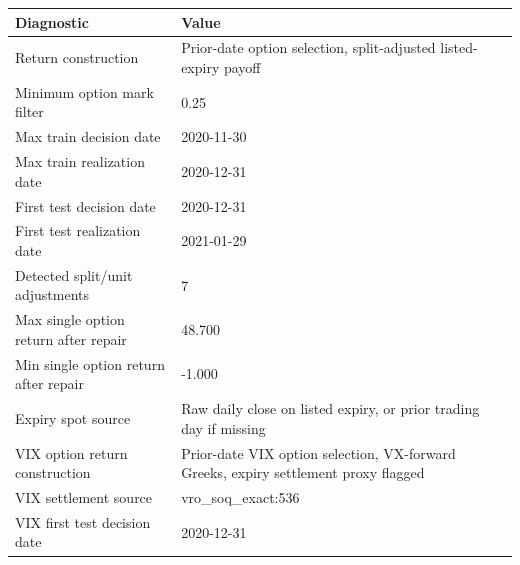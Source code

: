 \begin{tabular}{ll}
\toprule
Diagnostic & Value \\
\midrule
Return construction & Prior-date option selection, split-adjusted listed-expiry payoff \\
Minimum option mark filter & 0.25 \\
Max train decision date & 2020-11-30 \\
Max train realization date & 2020-12-31 \\
First test decision date & 2020-12-31 \\
First test realization date & 2021-01-29 \\
Detected split/unit adjustments & 7 \\
Max single option return after repair & 48.700 \\
Min single option return after repair & -1.000 \\
Expiry spot source & Raw daily close on listed expiry, or prior trading day if missing \\
VIX option return construction & Prior-date VIX option selection, VX-forward Greeks, expiry settlement proxy flagged \\
VIX settlement source & vro\_soq\_exact:536 \\
VIX first test decision date & 2020-12-31 \\
\bottomrule
\end{tabular}
